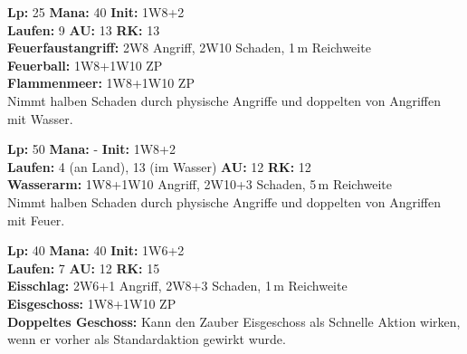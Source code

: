 \documentclass[../../Heldenanleitung2]{subfiles}
\begin{document}
\begin{multicols}{2}

\begin{tcolorbox}[title={Feuerelementar},colbacktitle=red, coltitle=black]    
   \textbf{Lp:} 25
   \textbf{Mana:} 40
   \textbf{Init:} 1W8+2\\
   \textbf{Laufen:} 9
   \textbf{AU:} 13
   \textbf{RK:} 13\\
   
   \textbf{Feuerfaustangriff:} 2W8 Angriff, 2W10 Schaden, 1\,m Reichweite\\
   
   \textbf{Feuerball:} 1W8+1W10 ZP\\
   
   \textbf{Flammenmeer:} 1W8+1W10 ZP\\
   
   Nimmt halben Schaden durch physische Angriffe und doppelten von Angriffen mit Wasser.
\end{tcolorbox}

\begin{tcolorbox}[title={Wasserelementar},colbacktitle=blue, coltitle=white]    
   \textbf{Lp:} 50
   \textbf{Mana:} -
   \textbf{Init:} 1W8+2\\
   \textbf{Laufen:} 4 (an Land), 13 (im Wasser)
   \textbf{AU:} 12
   \textbf{RK:} 12\\
   
   \textbf{Wasserarm:} 1W8+1W10 Angriff, 2W10+3 Schaden, 5\,m Reichweite\\
   
   Nimmt halben Schaden durch physische Angriffe und doppelten von Angriffen mit Feuer.
\end{tcolorbox}

\begin{tcolorbox}[title={Eiselementar},colbacktitle=cyan, coltitle=black]    
   \textbf{Lp:} 40
   \textbf{Mana:} 40
   \textbf{Init:} 1W6+2\\
   \textbf{Laufen:} 7
   \textbf{AU:} 12
   \textbf{RK:} 15\\
   
   \textbf{Eisschlag:} 2W6+1 Angriff, 2W8+3 Schaden, 1\,m Reichweite\\
   
   \textbf{Eisgeschoss:} 1W8+1W10 ZP\\
   
   \textbf{Doppeltes Geschoss:} Kann den Zauber Eisgeschoss als Schnelle Aktion wirken, wenn er vorher als Standardaktion gewirkt wurde.
\end{tcolorbox}


\end{multicols}
\end{document}

